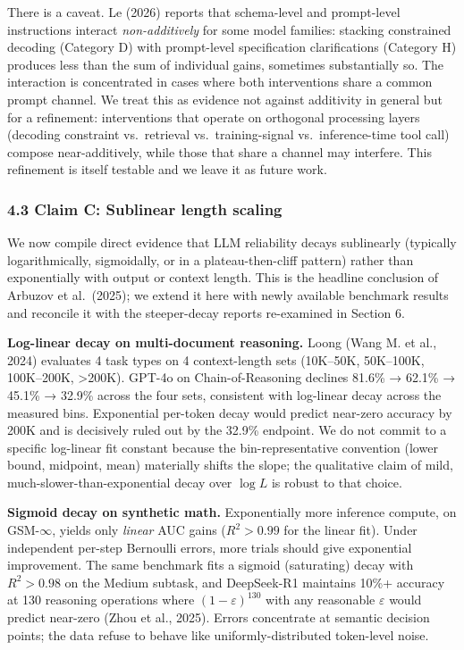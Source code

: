 \documentclass[
]{article}
\begin{document}
There is a caveat. Le (2026) reports that schema-level and prompt-level
instructions interact \emph{non-additively} for some model families:
stacking constrained decoding (Category D) with prompt-level
specification clarifications (Category H) produces less than the sum of
individual gains, sometimes substantially so. The interaction is
concentrated in cases where both interventions share a common prompt
channel. We treat this as evidence not against additivity in general but
for a refinement: interventions that operate on orthogonal processing
layers (decoding constraint vs.~retrieval vs.~training-signal
vs.~inference-time tool call) compose near-additively, while those that
share a channel may interfere. This refinement is itself testable and we
leave it as future work.

\subsubsection{4.3 Claim C: Sublinear length
scaling}\label{claim-c-sublinear-length-scaling}

We now compile direct evidence that LLM reliability decays sublinearly
(typically logarithmically, sigmoidally, or in a plateau-then-cliff
pattern) rather than exponentially with output or context length. This
is the headline conclusion of Arbuzov et al.~(2025); we extend it here
with newly available benchmark results and reconcile it with the
steeper-decay reports re-examined in Section 6.

\textbf{Log-linear decay on multi-document reasoning.} Loong (Wang M. et
al., 2024) evaluates 4 task types on 4 context-length sets (10K--50K,
50K--100K, 100K--200K, \textgreater200K). GPT-4o on Chain-of-Reasoning
declines 81.6\% → 62.1\% → 45.1\% → 32.9\% across the four sets,
consistent with log-linear decay across the measured bins. Exponential
per-token decay would predict near-zero accuracy by 200K and is
decisively ruled out by the 32.9\% endpoint. We do not commit to a
specific log-linear fit constant because the bin-representative
convention (lower bound, midpoint, mean) materially shifts the slope;
the qualitative claim of mild, much-slower-than-exponential decay over
\(\log L\) is robust to that choice.

\textbf{Sigmoid decay on synthetic math.} Exponentially more inference
compute, on GSM-\(\infty\), yields only \emph{linear} AUC gains
(\(R^2 > 0.99\) for the linear fit). Under independent per-step
Bernoulli errors, more trials should give exponential improvement. The
same benchmark fits a sigmoid (saturating) decay with \(R^2 > 0.98\) on
the Medium subtask, and DeepSeek-R1 maintains 10\%+ accuracy at 130
reasoning operations where \((1 - \varepsilon)^{130}\) with any
reasonable \(\varepsilon\) would predict near-zero (Zhou et al., 2025).
Errors concentrate at semantic decision points; the data refuse to
behave like uniformly-distributed token-level noise.
\end{document}
